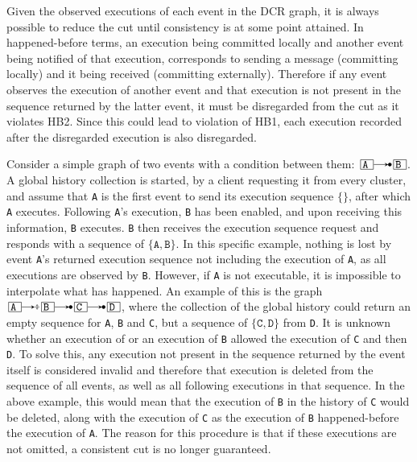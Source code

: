 \documentclass{article}
\begin{document}
	Given the observed executions of each event in the DCR graph, it is always possible to reduce the cut until consistency is at some point attained.
	In happened-before terms, an execution being committed locally and another event being notified of that execution, corresponds to sending a message (committing locally) and it being received (committing externally).
	Therefore if any event observes the execution of another event and that execution is not present in the sequence returned by the latter event, it must be disregarded from the cut as it violates HB2.
	Since this could lead to violation of HB1, each execution recorded after the disregarded execution is also disregarded.

	Consider a simple graph of two events with a condition between them: $\ev{A} \crel \ev{B}$.
	A global history collection is started, by a client requesting it from every cluster, and assume that \texttt{A} is the first event to send its execution sequence $\{\}$, after which \texttt{A} executes.
	Following \texttt{A}'s execution, \texttt{B} has been enabled, and upon receiving this information, \texttt{B} executes.
	\texttt{B} then receives the execution sequence request and responds with a sequence of $\{\texttt{A}, \texttt{B}\}$.
	In this specific example, nothing is lost by event \texttt{A}'s returned execution sequence not including the execution of \texttt{A}, as all executions are observed by \texttt{B}.
	However, if \texttt{A} is not executable, it is impossible to interpolate what has happened.
	An example of this is the graph $\ev{A} \erel \ev{B} \crel \ev{C} \crel \ev{D}$, where the collection of the global history could return an empty sequence for \texttt{A}, \texttt{B} and \texttt{C}, but a sequence of $\{\texttt{C}, \texttt{D}\}$ from \texttt{D}.
	It is unknown whether an execution of  or an execution of \texttt{B} allowed the execution of \texttt{C} and then \texttt{D}.
	To solve this, any execution not present in the sequence returned by the event itself is considered invalid and therefore that execution is deleted from the sequence of all events, as well as all following executions in that sequence.
	In the above example, this would mean that the execution of \texttt{B} in the history of \texttt{C} would be deleted, along with the execution of \texttt{C} as the execution of \texttt{B} happened-before the execution of \texttt{A}.
	The reason for this procedure is that if these executions are not omitted, a consistent cut is no longer guaranteed.
\end{document}
